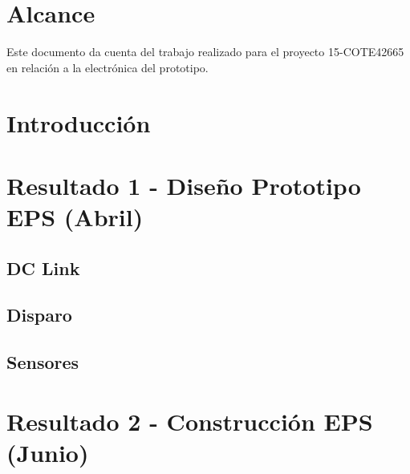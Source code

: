 \documentclass[12pt,twoside,onecolumn]{article}
\begin{document}
 
 
\newpage 
\section{Alcance}
Este documento da cuenta del trabajo realizado para el proyecto 15-COTE42665 en relación a la electrónica del prototipo.

\section{Introducción}

\section{Resultado 1 - Diseño Prototipo EPS (Abril)} %

\subsection{DC Link}

\subsection{Disparo}

\subsection{Sensores}


\section{Resultado 2 - Construcción EPS (Junio)} %
\end{document}
